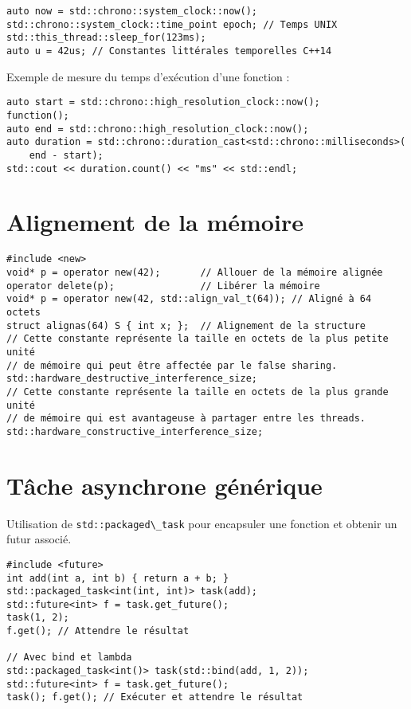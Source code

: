\documentclass{article}
\newcommand{\cd}{\lstinline}
\begin{document}
\begin{multicols*}{3}
\begin{lstlisting}
auto now = std::chrono::system_clock::now();
std::chrono::system_clock::time_point epoch; // Temps UNIX
std::this_thread::sleep_for(123ms);
auto u = 42us; // Constantes littérales temporelles C++14
\end{lstlisting}

Exemple de mesure du temps d'exécution d'une fonction :

\begin{lstlisting}
auto start = std::chrono::high_resolution_clock::now();
function();
auto end = std::chrono::high_resolution_clock::now();
auto duration = std::chrono::duration_cast<std::chrono::milliseconds>(
    end - start);
std::cout << duration.count() << "ms" << std::endl;
\end{lstlisting}

\section*{Alignement de la mémoire}

\begin{lstlisting}
#include <new>
void* p = operator new(42);       // Allouer de la mémoire alignée
operator delete(p);               // Libérer la mémoire
void* p = operator new(42, std::align_val_t(64)); // Aligné à 64 octets
struct alignas(64) S { int x; };  // Alignement de la structure
// Cette constante représente la taille en octets de la plus petite unité
// de mémoire qui peut être affectée par le false sharing.
std::hardware_destructive_interference_size;
// Cette constante représente la taille en octets de la plus grande unité
// de mémoire qui est avantageuse à partager entre les threads.
std::hardware_constructive_interference_size;
\end{lstlisting}

\section*{Tâche asynchrone générique}
Utilisation de \cd{std::packaged\_task} pour encapsuler une fonction et obtenir un futur associé.

\begin{lstlisting}
#include <future>
int add(int a, int b) { return a + b; }
std::packaged_task<int(int, int)> task(add);
std::future<int> f = task.get_future();
task(1, 2);
f.get(); // Attendre le résultat

// Avec bind et lambda
std::packaged_task<int()> task(std::bind(add, 1, 2));
std::future<int> f = task.get_future();
task(); f.get(); // Exécuter et attendre le résultat


\end{lstlisting}
\end{multicols*}
\end{document}
